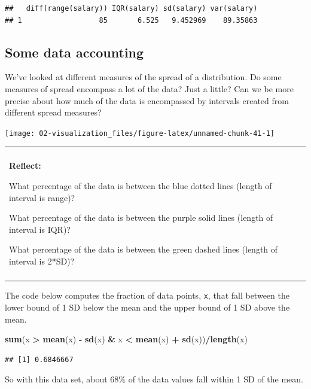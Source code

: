 \documentclass[
]{book}
\newenvironment{Shaded}{\begin{snugshade}}{\end{snugshade}}
\newcommand{\KeywordTok}[1]{\textcolor[rgb]{0.13,0.29,0.53}{\textbf{#1}}}
\newcommand{\NormalTok}[1]{#1}
\newcommand{\OperatorTok}[1]{\textcolor[rgb]{0.81,0.36,0.00}{\textbf{#1}}}
\newcommand{\StringTok}[1]{\textcolor[rgb]{0.31,0.60,0.02}{#1}}
\newenvironment{reflect}
{
    \begin{center}
    
    \begin{tabular}{|p{0.8\textwidth}|}
    \rowcolor{LightBlue}
    \hline\\
    \rowcolor{LightBlue}
    \textbf{Reflect:}
}
{
    \\\rowcolor{LightBlue}
    \\\hline
    \end{tabular} 
    \end{center}
}
\begin{document}
\begin{verbatim}
##   diff(range(salary)) IQR(salary) sd(salary) var(salary)
## 1                  85       6.525   9.452969    89.35863
\end{verbatim}

\hypertarget{intro-zscore}{%
\subsection{Some data accounting}\label{intro-zscore}}

We've looked at different measures of the spread of a distribution. Do some measures of spread encompass a lot of the data? Just a little? Can we be more precise about how much of the data is encompassed by intervals created from different spread measures?

\begin{center}\texttt{[image: 02-visualization\_files/figure-latex/unnamed-chunk-41-1]} \end{center}

\begin{reflect}
What percentage of the data is between the blue dotted lines (length of
interval is range)?

What percentage of the data is between the purple solid lines (length of
interval is IQR)?

What percentage of the data is between the green dashed lines (length of
interval is 2*SD)?
\end{reflect}

The code below computes the fraction of data points, \texttt{x}, that fall between the lower bound of 1 SD below the mean and the upper bound of 1 SD above the mean.

\begin{Shaded}
\begin{Highlighting}[]
\KeywordTok{sum}\NormalTok{(x }\OperatorTok{>}\StringTok{ }\KeywordTok{mean}\NormalTok{(x) }\OperatorTok{-}\StringTok{ }\KeywordTok{sd}\NormalTok{(x) }\OperatorTok{&}\StringTok{ }\NormalTok{x }\OperatorTok{<}\StringTok{ }\KeywordTok{mean}\NormalTok{(x) }\OperatorTok{+}\StringTok{ }\KeywordTok{sd}\NormalTok{(x))}\OperatorTok{/}\KeywordTok{length}\NormalTok{(x)}
\end{Highlighting}
\end{Shaded}

\begin{verbatim}
## [1] 0.6846667
\end{verbatim}

So with this data set, about 68\% of the data values fall within 1 SD of the mean.
\end{document}
